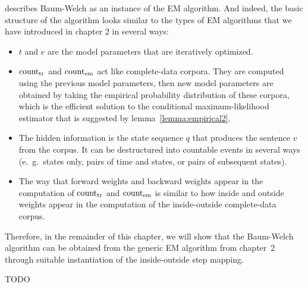 \cite{jm09} describes Baum-Welch as an instance of the EM algorithm. And
indeed, the basic structure of the algorithm looks similar to the types of EM
algorithms that we have introduced in chapter 2 in several ways:
\begin{itemize}
 \item $t$ and $e$ are the model parameters that are iteratively optimized.
 \item $\operatorname{count}_\mathrm{tr}$ and $\operatorname{count}_\mathrm{em}$ act like complete-data
  corpora. They are computed using the previous model parameters, then new
  model parameters are obtained by taking the empirical probability
  distribution of these corpora, which is the efficient solution to the
  conditional maximum-likelihood estimator that is suggested by
  lemma~\ref{lemma:empirical2}.
 \item The hidden information is the state sequence $q$ that produces the
  sentence $v$ from the corpus. It can be destructured into countable events in
  several ways (e.~g.~states only, pairs of time and states, or pairs of
  subsequent states).
 \item The way that forward weights and backward weights appear in the
  computation of $\operatorname{count}_\mathrm{tr}$ and $\operatorname{count}_\mathrm{em}$ is similar to how
  inside and outside weights appear in the computation of the inside-outside
  complete-data corpus.
\end{itemize}

Therefore, in the remainder of this chapter, we will show that the Baum-Welch
algorithm can be obtained from the generic EM algorithm from chapter~2 through
suitable instantiation of the inside-outside step mapping.

{\color{red}TODO}
